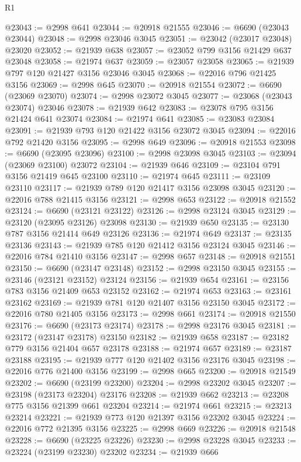 \begin{lexlean}{R1}
\begin{coremodule}
@23043 := @2998 @641
@23044 := @20918 @21555
@23046 := @6690 (@23043 @23044)
@23048 := @2998 @23046 @3045
@23051 := @23042 (@23017 @23048) @23020
@23052 := @21939 @638
@23057 := @23052 @799 @3156 @21429 @637 @23048
@23058 := @21974 @637
@23059 := @23057 @23058
@23065 := @21939 @797 @120 @21427 @3156 @23046 @3045
@23068 := @22016 @796 @21425 @3156
@23069 := @2998 @645
@23070 := @20918 @21554
@23072 := @6690 (@23069 @23070)
@23074 := @2998 @23072 @3045
@23077 := @23068 (@23043 @23074) @23046
@23078 := @21939 @642
@23083 := @23078 @795 @3156 @21424 @641 @23074
@23084 := @21974 @641
@23085 := @23083 @23084
@23091 := @21939 @793 @120 @21422 @3156 @23072 @3045
@23094 := @22016 @792 @21420 @3156
@23095 := @2998 @649
@23096 := @20918 @21553
@23098 := @6690 (@23095 @23096)
@23100 := @2998 @23098 @3045
@23103 := @23094 (@23069 @23100) @23072
@23104 := @21939 @646
@23109 := @23104 @791 @3156 @21419 @645 @23100
@23110 := @21974 @645
@23111 := @23109 @23110
@23117 := @21939 @789 @120 @21417 @3156 @23098 @3045
@23120 := @22016 @788 @21415 @3156
@23121 := @2998 @653
@23122 := @20918 @21552
@23124 := @6690 (@23121 @23122)
@23126 := @2998 @23124 @3045
@23129 := @23120 (@23095 @23126) @23098
@23130 := @21939 @650
@23135 := @23130 @787 @3156 @21414 @649 @23126
@23136 := @21974 @649
@23137 := @23135 @23136
@23143 := @21939 @785 @120 @21412 @3156 @23124 @3045
@23146 := @22016 @784 @21410 @3156
@23147 := @2998 @657
@23148 := @20918 @21551
@23150 := @6690 (@23147 @23148)
@23152 := @2998 @23150 @3045
@23155 := @23146 (@23121 @23152) @23124
@23156 := @21939 @654
@23161 := @23156 @783 @3156 @21409 @653 @23152
@23162 := @21974 @653
@23163 := @23161 @23162
@23169 := @21939 @781 @120 @21407 @3156 @23150 @3045
@23172 := @22016 @780 @21405 @3156
@23173 := @2998 @661
@23174 := @20918 @21550
@23176 := @6690 (@23173 @23174)
@23178 := @2998 @23176 @3045
@23181 := @23172 (@23147 @23178) @23150
@23182 := @21939 @658
@23187 := @23182 @779 @3156 @21404 @657 @23178
@23188 := @21974 @657
@23189 := @23187 @23188
@23195 := @21939 @777 @120 @21402 @3156 @23176 @3045
@23198 := @22016 @776 @21400 @3156
@23199 := @2998 @665
@23200 := @20918 @21549
@23202 := @6690 (@23199 @23200)
@23204 := @2998 @23202 @3045
@23207 := @23198 (@23173 @23204) @23176
@23208 := @21939 @662
@23213 := @23208 @775 @3156 @21399 @661 @23204
@23214 := @21974 @661
@23215 := @23213 @23214
@23221 := @21939 @773 @120 @21397 @3156 @23202 @3045
@23224 := @22016 @772 @21395 @3156
@23225 := @2998 @669
@23226 := @20918 @21548
@23228 := @6690 (@23225 @23226)
@23230 := @2998 @23228 @3045
@23233 := @23224 (@23199 @23230) @23202
@23234 := @21939 @666

\end{coremodule}
\end{lexlean}
